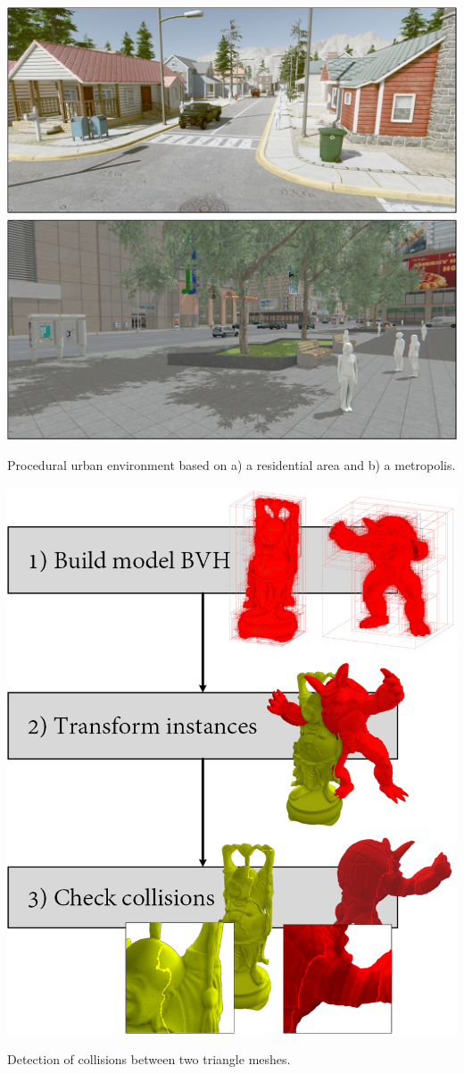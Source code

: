 \begin{marginfigure}[.2cm]
    \centering
    \includegraphics[width=\linewidth]{figs/lidar_simulation/procedural_urban.png}
	\caption{Procedural urban environment based on a) a residential area and b) a metropolis. }
	\label{fig:procedural_urban}
\end{marginfigure}
\begin{marginfigure} [8.cm]
	\centering
	\includegraphics[width=\linewidth]{figs/lidar_simulation/mesh_collision.png}
	\caption{Detection of collisions between two triangle meshes. }
	\label{fig:triangle_mesh_collision}
\end{marginfigure}
